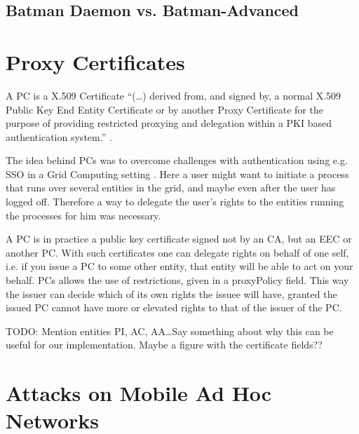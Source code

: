 \subsection{Batman Daemon vs. Batman-Advanced}




\section{Proxy Certificates}
A \acf{PC} is a X.509 Certificate ``(\ldots) derived from, and signed by, a
normal X.509 Public Key End Entity Certificate or by another Proxy Certificate
for the purpose of providing restricted proxying and delegation within a PKI
based authentication system.'' \cite{rfc3820}.

The idea behind \acp{PC} was to overcome challenges with authentication
using e.g. \ac{SSO} in a Grid Computing setting \cite{foster1998security}. Here
a user might want to initiate a process that runs over several entities in the
grid, and maybe even after the user has logged off. Therefore a way to delegate
the user's rights to the entities running the processes for him was necessary.

A \ac{PC} is in practice a public key certificate signed not by an \ac{CA}, but
an \ac{EEC} or another \ac{PC}. With such certificates one can delegate rights
on behalf of one self, i.e. if you issue a \ac{PC} to some other entity, that
entity will be able to act on your behalf. \acp{PC} allows the use of
restrictions, given in a proxyPolicy field. This way the issuer can decide which
of its own rights the issuee will have, granted the issued \ac{PC} cannot have
more or elevated rights to that of the issuer of the \ac{PC}.

TODO: Mention entities PI, AC, AA\ldots Say something about why this can be
useful for our implementation. Maybe a figure with the certificate fields??




\section{Attacks on Mobile Ad Hoc Networks}
